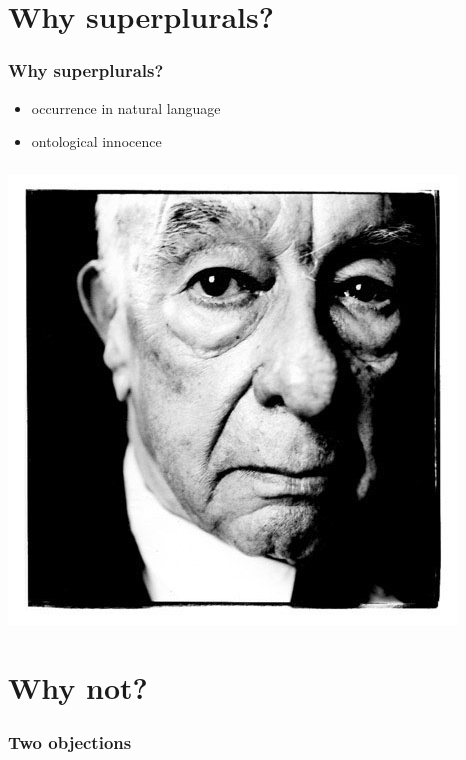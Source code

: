 \documentclass[serif]{beamer}
\begin{document}
\section{Why superplurals?}

\begin{frame}
\frametitle{Why superplurals?}
\begin{itemize}[<+->]
  \item occurrence in natural language
  \item ontological innocence
\end{itemize}
\end{frame}

\begin{frame}
\frametitle{}
\begin{center}
\includegraphics[width=\textwidth,height=0.8\textheight,keepaspectratio]{quine.jpg}
\end{center}
\end{frame}

\section{Why not?}

\begin{frame}
\frametitle{Two objections}

\end{frame}
\end{document}
